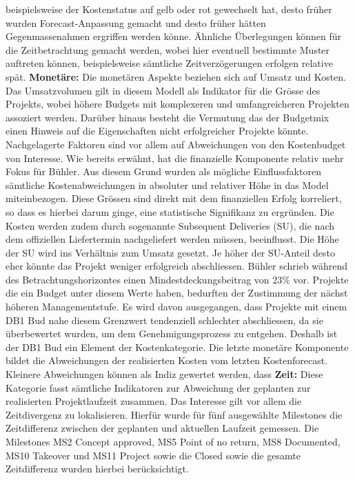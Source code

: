 \documentclass[11pt]{article}
\begin{document}
beispielsweise der Kostenstatus auf gelb oder rot gewechselt hat, desto früher wurden Forecast-Anpassung gemacht und desto früher hätten Gegenmassenahmen ergriffen werden könne. Ähnliche Überlegungen können für die Zeitbetrachtung gemacht werden, wobei hier eventuell bestimmte Muster auftreten können, beispielsweise sämtliche Zeitverzögerungen erfolgen relative spät. 
\newline\newline\textbf{Monetäre:} Die monetären Aspekte beziehen sich auf Umsatz und Kosten. Das Umsatzvolumen gilt in diesem Modell als Indikator für die Grösse des Projekts, wobei höhere Budgets mit komplexeren und umfangreicheren Projekten assoziert werden. Darüber hinaus besteht die Vermutung das der Budgetmix einen Hinweis auf die Eigenschaften nicht erfolgreicher Projekte könnte.
\newline Nachgelagerte Faktoren sind vor allem auf Abweichungen von den Kostenbudget von Interesse. Wie bereits erwähnt, hat die finanzielle Komponente relativ mehr Fokus für Bühler. Aus diesem Grund wurden als mögliche Einflussfaktoren sämtliche Kostenabweichungen in absoluter und relativer Höhe in das Model miteinbezogen. Diese Grössen sind direkt mit dem finanziellen Erfolg korreliert, so dass es hierbei darum ginge, eine statistische Signifikanz zu ergründen. Die Kosten werden zudem durch sogenannte Subsequent Deliveries (SU), die nach dem offiziellen Liefertermin nachgeliefert werden müssen, beeinflusst. Die Höhe der SU wird ins Verhältnis zum Umsatz gesetzt. Je höher der SU-Anteil desto eher könnte das Projekt weniger erfolgreich abschliessen.
\newline Bühler schrieb während des Betrachtungshorizontes einen Mindestdeckungsbeitrag von 23\% vor. Projekte die ein Budget unter diesem Werte haben, bedurften der Zustimmung der nächst höheren Managementstufe. Es wird davon ausgegangen, dass Projekte mit einem DB1 Bud nahe diesem Grenzwert tendenziell schlechter abschliessen, da sie überbewertet wurden, um dem Genehmigungsprozess zu entgehen. Deshalb ist der DB1 Bud ein Element der Kostenkategorie.
\newline Die letzte monetäre Komponente bildet die Abweichungen der realisierten Kosten vom letzten Kostenforecast. Kleinere Abweichungen können als Indiz gewertet werden, dass 
\newline\newline\textbf{Zeit:} Diese Kategorie fasst sämtliche Indikatoren zur Abweichung der geplanten zur realisierten Projektlaufzeit zusammen. Das Interesse gilt vor allem die Zeitdivergenz zu lokalisieren. Hierfür wurde für fünf ausgewählte Milestones die Zeitdifferenz zwischen der geplanten und aktuellen Laufzeit gemessen. Die Milestones MS2 Concept approved, MS5 Point of no return, MS8 Documented, MS10 Takeover und MS11 Project sowie die  Closed sowie die gesamte Zeitdifferenz wurden hierbei berücksichtigt. 
\end{document}
